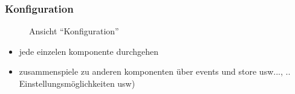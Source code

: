 \subsubsection{Konfiguration}
\label{sec:appSichtKonfiguration}



\begin{figure}[H]
	\centering 
    \label{fig:APP_Configuration_View}
    \hspace{1cm}
	\label{fig:App_Bluetooth_Search}
	\caption{Ansicht \enquote{Konfiguration}}
	\label{fig:APP_Configuration}
\end{figure}



\begin{itemize}
\item jede einzelen komponente durchgehen
\item zusammenspiele zu anderen komponenten über events und store usw..., .. Einstellungsmöglichkeiten usw)
\end{itemize}

